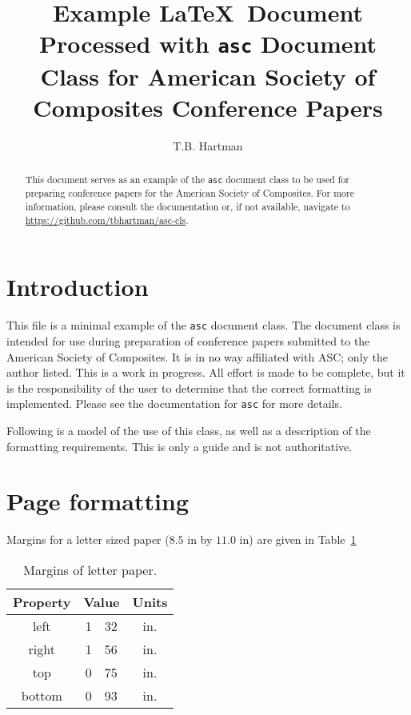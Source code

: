 \documentclass[]{asc}
\begin{document}
\title{Example \LaTeX\ Document Processed with \texttt{asc} Document Class for American Society of Composites Conference Papers}
\author{T.B. Hartman}

\maketitle

\begin{abstract}
    This document serves as an example of the \texttt{asc} document class to be used for preparing conference papers for the American Society of Composites.
    For more information, please consult the documentation or, if not available, navigate to \url{https://github.com/tbhartman/asc-cls}.
\end{abstract}

\section*{Introduction}

This file is a minimal example of the \texttt{asc} document class.
The document class is intended for use during preparation of conference papers submitted to the American Society of Composites.
It is in no way affiliated with ASC; only the author listed.
This is a work in progress.
All effort is made to be complete, but it is the responsibility of the user to determine that the correct formatting is implemented.
Please see the documentation for \texttt{asc} for more details.

Following is a model of the use of this class, as well as a description of the formatting requirements.
This is only a guide and is not authoritative.

\section*{Page formatting}

Margins for a letter sized paper ($8.5 \text{~in}$ by $11.0 \text{~in}$) are given in Table~\ref{tab:margins}
\begin{table}
    \centering
    \caption{Margins of letter paper.}
    \begin{tabular}{|c|r@{.}l|c|}
        \hline
        Property & \multicolumn{2}{|c|}{Value} & Units \\
        \hline \hline
        left   & 1&32 & in. \\
        right  & 1&56 & in. \\
        top    & 0&75 & in. \\
        bottom & 0&93 & in. \\
        \hline
    \end{tabular}
    \label{tab:margins}
\end{table}
\end{document}

